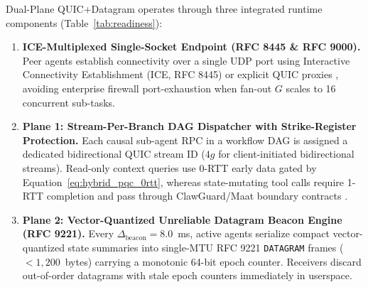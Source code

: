 \documentclass[11pt]{article}
\begin{document}
Dual-Plane QUIC+Datagram operates through three integrated runtime components (Table~\ref{tab:readiness}):
\begin{enumerate}
  \item \textbf{ICE-Multiplexed Single-Socket Endpoint (RFC 8445 \& RFC 9000).} Peer agents establish connectivity over a single UDP port using Interactive Connectivity Establishment (ICE, RFC 8445) \citep{ari2018_18} or explicit QUIC proxies \citep{buchet2026quicproxies}, avoiding enterprise firewall port-exhaustion when fan-out $G$ scales to 16 concurrent sub-tasks.
  \item \textbf{Plane 1: Stream-Per-Branch DAG Dispatcher with Strike-Register Protection.} Each causal sub-agent RPC in a workflow DAG is assigned a dedicated bidirectional QUIC stream ID ($4g$ for client-initiated bidirectional streams). Read-only context queries use 0-RTT early data gated by Equation~\eqref{eq:hybrid_pqc_0rtt}, whereas state-mutating tool calls require 1-RTT completion and pass through ClawGuard/Maat boundary contracts \citep{arxiv2604_11790, elina2026maat}.
  \item \textbf{Plane 2: Vector-Quantized Unreliable Datagram Beacon Engine (RFC 9221).} Every $\Delta_{\mathrm{beacon}} = 8.0$~ms, active agents serialize compact vector-quantized state summaries into single-MTU RFC 9221 \texttt{DATAGRAM} frames ($<1{,}200$~bytes) carrying a monotonic 64-bit epoch counter. Receivers discard out-of-order datagrams with stale epoch counters immediately in userspace.
\end{enumerate}
\end{document}
